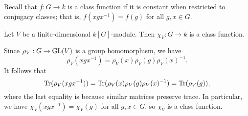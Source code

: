 Recall that $f : G \to k$ is a class function if it is constant when restricted 
to conjugacy classes; that is, $f(xgx^{-1}) = f(g)$ for all $g, x \in G$. 

\begin{thm}
    Let $V$ be a finite-dimensional $k[G]$-module. Then $\chi_V : G \to k$ is a 
    class function. 
\end{thm}
\begin{pf}
    Since $\rho_V : G \to \operatorname{GL}(V)$ is a group homomorphism, we have 
    \[ \rho_V(xgx^{-1}) = \rho_V(x) \rho_V(g) \rho_V(x)^{-1}. \] 
    It follows that 
    \[ \operatorname{Tr}(\rho_V(xgx^{-1})) = \operatorname{Tr}(\rho_V(x) \rho_V(g) \rho_V(x)^{-1}) 
    = \operatorname{Tr}(\rho_V(g)), \] 
    where the last equality is because similar matrices preserve trace. 
    In particular, we have $\chi_V(xgx^{-1}) = \chi_V(g)$ for all $g, x \in G$, 
    so $\chi_V$ is a class function. 
\end{pf}

